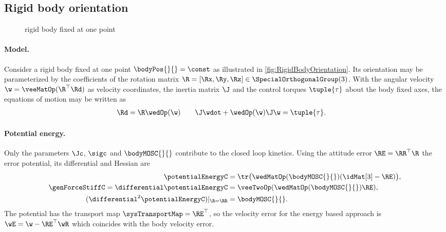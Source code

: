 \subsection{Rigid body orientation}\label{sec:CtrlExampleRigidBodyOrientation}
\begin{figure}[ht]
 \centering
 
 \caption{rigid body fixed at one point}
 \label{fig:RigidBodyOrientation}
\end{figure}

\paragraph{Model.}
Consider a rigid body fixed at one point $\bodyPos{}{} = \const$ as illustrated in \autoref{fig:RigidBodyOrientation}.
Its orientation may be parameterized by the coefficients of the rotation matrix $\R = [\Rx,\Ry,\Rz] \in \SpecialOrthogonalGroup(3)$.
With the angular velocity $\w = \veeMatOp(\R^\top\Rd)$ as velocity coordinates, the inertia matrix $\J$ and the control torques $\tuple{\tau}$ about the body fixed axes, the equations of motion may be written as
\begin{align}
 \Rd = \R \wedOp(\w)
\qquad
 \J\wdot + \wedOp(\w) \J \w &= \tuple{\tau}.
\end{align}

\paragraph{Potential energy.}
Only the parameters $\Jc$, $\sigc$ and $\bodyMOSC{}{}$ contribute to the closed loop kinetics.
Using the attitude error $\RE = \RR^\top \R$ the error potential, its differential and Hessian are
\begin{subequations}
\begin{align}
 \potentialEnergyC &= \tr\big( \wedMatOp(\bodyMOSC{}{}) (\idMat[3] - \RE) \big),
\\
 \genForceStiffC = \differential \potentialEnergyC &= \veeTwoOp(\wedMatOp(\bodyMOSC{}{}) \RE),
\\
 (\differential^2 \potentialEnergyC)|_{\R=\RR} &= \bodyMOSC{}{}.
\end{align} 
\end{subequations}
The potential has the transport map $\sysTransportMap = \RE^\top$, so the velocity error for the energy based approach is $\wE = \w - \RE^\top \wR$ which coincides with the body velocity error.

